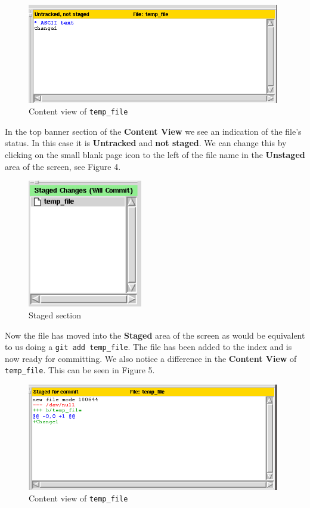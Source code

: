 \begin{figure}[hbt]
\centering
\includegraphics[width=11cm]{images/f-w5-d3.png}
\caption{Content view of \texttt{temp\_file}}
\end{figure}

In the top banner section of the \textbf{Content View} we see an indication of the file's status.  In this case it is \textbf{Untracked} and \textbf{not staged}.  We can change this by clicking on the small blank page icon to the left of the file name in the \textbf{Unstaged} area of the screen, see Figure 4.

\begin{figure}[hbt]
\centering
\includegraphics[width=5cm]{images/f-w5-d4.png}
\caption{Staged section}
\end{figure}

Now the file has moved into the \textbf{Staged} area of the screen as would be equivalent to us doing a \texttt{git add temp\_file}.  The file has been added to the index and is now ready for committing.  We also notice a difference in the \textbf{Content View} of \texttt{temp\_file}.  This can be seen in Figure 5.

\begin{figure}[hbt]
\centering
\includegraphics[width=11cm]{images/f-w5-d5.png}
\caption{Content view of \texttt{temp\_file}}
\end{figure}

